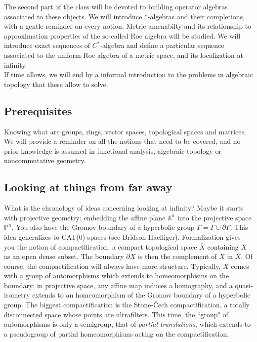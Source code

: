 The second part of the class will be devoted to building operator algebras associated to these objects. We will introduce $*$-algebras and their completions, with a gentle reminder on every notion. Metric amenabilty and its relationship to approximation properties of the so-called Roe algebra will be studied. We will introduce exact sequences of $C^*$-algebra and define a particular sequence associated to the uniform Roe algebra of a metric space, and its localization at infinity.\\

If time allows, we will end by a informal introduction to the problems in algebraic topology that these allow to solve.  

\subsection*{Prerequisites}

Knowing what are groups, rings, vector spaces, topological spaces and matrices. We will provide a reminder on all the notions that need to be covered, and no prior knowledge is assumed in functional analysis, algebraic topology or noncommutative geometry.

\subsection*{Looking at things from far away}

What is the chronology of ideas concerning looking at infinity? Maybe it starts with projective geometry: embedding the affine plane $\mathbb A^n$ into the projective space $\mathbb P^n$. You also have the Gromov boundary of a hyperbolic group $\overline \Gamma = \Gamma \cup \partial \Gamma$. This idea generalizes to CAT(0) spaces (see Bridson-Haefliger). Formalization gives you the notion of compactification: a compact topological space $\overline X$ containing $X$ as an open dense subset. The boundary $\partial X$ is then the complement of $X$ in $\overline X$. Of course, the compactification will always have more structure. Typically, $X$ comes with a group of automorphisms which extends to homeomorphisms on the boundary: in projective space, any affine map induces a homography, and a quasi-isometry extends to an homeomorphism of the Gromov boundary of a hyperbolic group. The biggest compactification is the Stone-\v{C}ech compactification, a totally disconnected space whose points are ultrafilters. This time, the ``group" of automorphisms is only a semigroup, that of \textit{partial translations}, which extends to a pseudogroup of partial homeomorphisms acting on the compactification.   
\newpage

